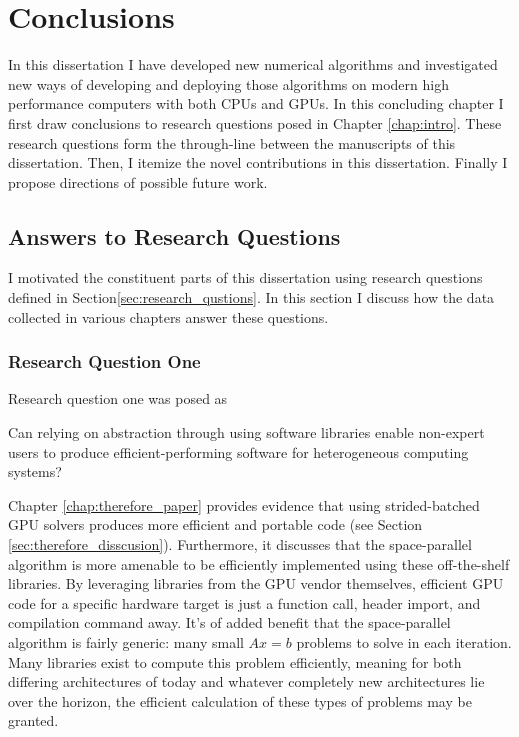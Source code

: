 
\chapter{Conclusions}
\label{chap:conclusion}


In this dissertation I have developed new numerical algorithms and investigated new ways of developing and deploying those algorithms on modern high performance computers with both CPUs and GPUs.
In this concluding chapter I first draw conclusions to research questions posed in Chapter \ref{chap:intro}.
These research questions form the through-line between the manuscripts of this dissertation.
Then, I itemize the novel contributions in this dissertation.
Finally I propose directions of possible future work.

\section{Answers to Research Questions}

I motivated the constituent parts of this dissertation using research questions defined in Section\ref{sec:research_qustions}.
In this section I discuss how the data collected in various chapters answer these questions.

\subsection{Research Question One}

Research question one was posed as
\begin{displayquote}
Can relying on abstraction through using software libraries enable non-expert users to produce efficient-performing software for heterogeneous computing systems?
\end{displayquote}

Chapter \ref{chap:therefore_paper} provides evidence that using strided-batched GPU solvers produces more efficient and portable code (see Section \ref{sec:therefore_disscusion}).
Furthermore, it discusses that the space-parallel algorithm is more amenable to be efficiently implemented using these off-the-shelf libraries.
By leveraging libraries from the GPU vendor themselves, efficient GPU code for a specific hardware target is just a function call, header import, and compilation command away.
It's of added benefit that the space-parallel algorithm is fairly generic: many small $Ax=b$ problems to solve in each iteration.
Many libraries exist to compute this problem efficiently, meaning for both differing architectures of today and whatever completely new architectures lie over the horizon, the efficient calculation of these types of problems may be granted.

